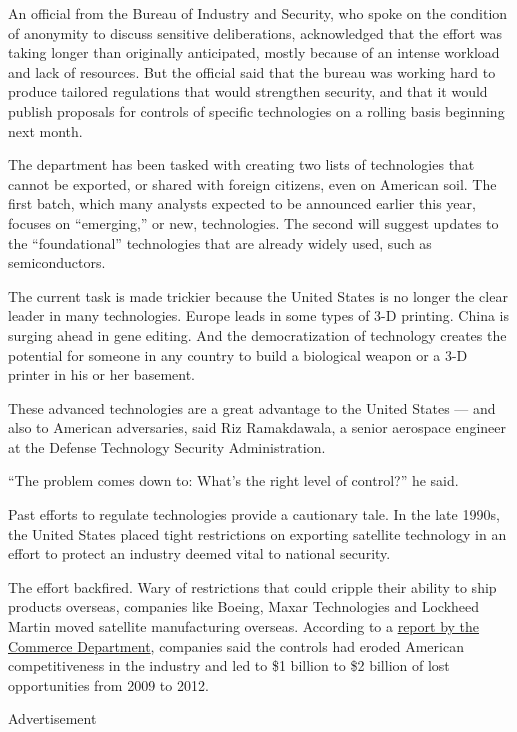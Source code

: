 An official from the Bureau of Industry and Security, who spoke on the
condition of anonymity to discuss sensitive deliberations, acknowledged
that the effort was taking longer than originally anticipated, mostly
because of an intense workload and lack of resources. But the official
said that the bureau was working hard to produce tailored regulations
that would strengthen security, and that it would publish proposals for
controls of specific technologies on a rolling basis beginning next
month.

The department has been tasked with creating two lists of technologies
that cannot be exported, or shared with foreign citizens, even on
American soil. The first batch, which many analysts expected to be
announced earlier this year, focuses on ``emerging,'' or new,
technologies. The second will suggest updates to the ``foundational''
technologies that are already widely used, such as semiconductors.

The current task is made trickier because the United States is no longer
the clear leader in many technologies. Europe leads in some types of 3-D
printing. China is surging ahead in gene editing. And the
democratization of technology creates the potential for someone in any
country to build a biological weapon or a 3-D printer in his or her
basement.

These advanced technologies are a great advantage to the United States
--- and also to American adversaries, said Riz Ramakdawala, a senior
aerospace engineer at the Defense Technology Security Administration.

``The problem comes down to: What's the right level of control?'' he
said.

Past efforts to regulate technologies provide a cautionary tale. In the
late 1990s, the United States placed tight restrictions on exporting
satellite technology in an effort to protect an industry deemed vital to
national security.

The effort backfired. Wary of restrictions that could cripple their
ability to ship products overseas, companies like Boeing, Maxar
Technologies and Lockheed Martin moved satellite manufacturing overseas.
According to a
\href{https://www.bis.doc.gov/index.php/documents/technology-evaluation/898-space-export-control-report/file}{report
by the Commerce Department}, companies said the controls had eroded
American competitiveness in the industry and led to \$1 billion to \$2
billion of lost opportunities from 2009 to 2012.

Advertisement

